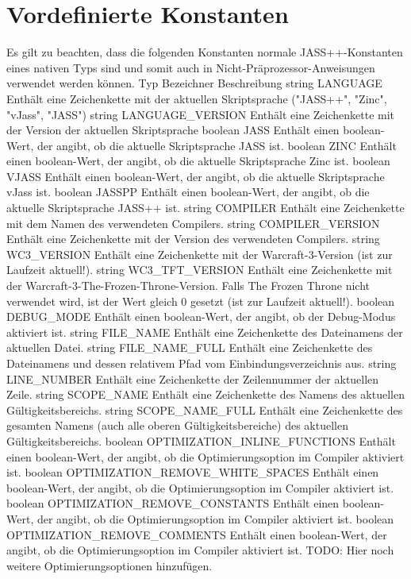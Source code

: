 \section{Vordefinierte Konstanten}
Es gilt zu beachten, dass die folgenden Konstanten normale JASS++-Konstanten eines nativen Typs sind und somit auch in Nicht-Präprozessor-Anweisungen verwendet werden können.
Typ Bezeichner                                    Beschreibung
string LANGUAGE                                   Enthält eine Zeichenkette mit der aktuellen Skriptsprache ("JASS++", "Zinc", "vJass", "JASS")
string LANGUAGE_VERSION                           Enthält eine Zeichenkette mit der Version der aktuellen Skriptsprache
boolean JASS                                      Enthält einen boolean-Wert, der angibt, ob die aktuelle Skriptsprache JASS ist.
boolean ZINC                                      Enthält einen boolean-Wert, der angibt, ob die aktuelle Skriptsprache Zinc ist.
boolean VJASS                                     Enthält einen boolean-Wert, der angibt, ob die aktuelle Skriptsprache vJass ist.
boolean JASSPP                                    Enthält einen boolean-Wert, der angibt, ob die aktuelle Skriptsprache JASS++ ist.
string COMPILER                                   Enthält eine Zeichenkette mit dem Namen des verwendeten Compilers.
string COMPILER_VERSION                           Enthält eine Zeichenkette mit der Version des verwendeten Compilers.
string WC3_VERSION                                Enthält eine Zeichenkette mit der Warcraft-3-Version (ist zur Laufzeit aktuell!).
string WC3_TFT_VERSION                            Enthält eine Zeichenkette mit der Warcraft-3-The-Frozen-Throne-Version. Falls The Frozen Throne nicht verwendet wird, ist der Wert gleich 0 gesetzt (ist zur Laufzeit aktuell!).
boolean DEBUG_MODE                                Enthält einen boolean-Wert, der angibt, ob der Debug-Modus aktiviert ist.
string FILE_NAME                                  Enthält eine Zeichenkette des Dateinamens der aktuellen Datei.
string FILE_NAME_FULL                             Enthält eine Zeichenkette des Dateinamens und dessen relativem Pfad vom Einbindungsverzeichnis aus.
string LINE_NUMBER                                Enthält eine Zeichenkette der Zeilennummer der aktuellen Zeile.
string SCOPE_NAME                                 Enthält eine Zeichenkette des Namens des aktuellen Gültigkeitsbereichs.
string SCOPE_NAME_FULL                            Enthält eine Zeichenkette des gesamten Namens (auch alle oberen Gültigkeitsbereiche) des aktuellen Gültigkeitsbereichs.
boolean OPTIMIZATION_INLINE_FUNCTIONS             Enthält einen boolean-Wert, der angibt, ob die Optimierungsoption im Compiler aktiviert ist.
boolean OPTIMIZATION_REMOVE_WHITE_SPACES          Enthält einen boolean-Wert, der angibt, ob die Optimierungsoption im Compiler aktiviert ist.
boolean OPTIMIZATION_REMOVE_CONSTANTS             Enthält einen boolean-Wert, der angibt, ob die Optimierungsoption im Compiler aktiviert ist.
boolean OPTIMIZATION_REMOVE_COMMENTS              Enthält einen boolean-Wert, der angibt, ob die Optimierungsoption im Compiler aktiviert ist.
TODO: Hier noch weitere Optimierungsoptionen hinzufügen.

